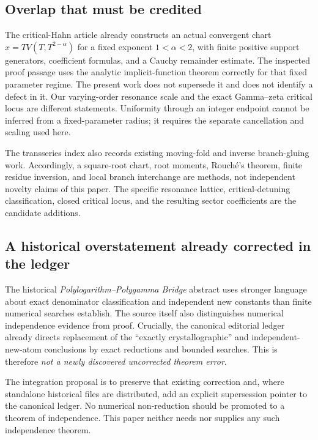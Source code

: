\documentclass[11pt,a4paper]{article}
\numberwithin{equation}{section}
\theoremstyle{definition}\newtheorem{definition}[theorem]{Definition}
\theoremstyle{remark}\newtheorem{remark}[theorem]{Remark}
\begin{document}
\subsection{Overlap that must be credited}
The critical-Hahn article \cite{repo-hahn} already constructs an actual
convergent chart $x=T V(T,T^{2-\alpha})$ for a fixed exponent
$1<\alpha<2$, with finite positive support generators, coefficient
formulas, and a Cauchy remainder estimate. The inspected proof passage
uses the analytic implicit-function theorem correctly for that fixed
parameter regime. The present work does not supersede it and does not
identify a defect in it. Our varying-order resonance scale and the exact
Gamma--zeta critical locus are different statements. Uniformity through
an integer endpoint cannot be inferred from a fixed-parameter radius;
it requires the separate cancellation and scaling used here.

The transseries index also records existing moving-fold and inverse
branch-gluing work. Accordingly, a square-root chart, root moments,
Rouch\'e's theorem, finite residue inversion, and local branch interchange
are methods, not independent novelty claims of this paper. The specific
resonance lattice, critical-detuning classification, closed critical locus,
and the resulting sector coefficients are the candidate additions.

\subsection{A historical overstatement already corrected in the ledger}
The historical \emph{Polylogarithm--Polygamma Bridge} abstract
\cite{repo-bridge} uses stronger language about exact denominator
classification and independent new constants than finite numerical
searches establish. The source itself also distinguishes numerical
independence evidence from proof. Crucially, the canonical editorial
ledger \cite{repo-ledger} already directs replacement of the
``exactly crystallographic'' and independent-new-atom conclusions by
exact reductions and bounded searches. This is therefore \emph{not a
newly discovered uncorrected theorem error}.

The integration proposal is to preserve that existing correction and,
where standalone historical files are distributed, add an explicit
supersession pointer to the canonical ledger. No numerical
non-reduction should be promoted to a theorem of independence. This
paper neither needs nor supplies any such independence theorem.
\end{document}
